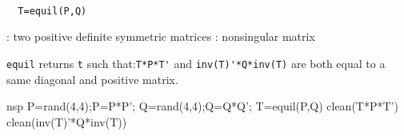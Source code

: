 \begin{mandesc}
   \\ %
\end{mandesc}
\begin{calling_sequence}
\begin{verbatim}
  T=equil(P,Q)  
\end{verbatim}
\end{calling_sequence}
\begin{parameters}
  \begin{varlist}
    : two positive definite symmetric matrices
    : nonsingular matrix
  \end{varlist}
\end{parameters}
\begin{mandescription}
  \verb!equil! returns \verb!t! such that:\verb!T*P*T'! and  \verb!inv(T)'*Q*inv(T)!  are both equal to a same 
  diagonal and positive matrix.
\end{mandescription}
\begin{examples}
  \begin{mintednsp}{nsp}
    P=rand(4,4);P=P*P';
    Q=rand(4,4);Q=Q*Q';
    T=equil(P,Q)
    clean(T*P*T')
    clean(inv(T)'*Q*inv(T))
  \end{mintednsp}
\end{examples}
\begin{manseealso}
      
\end{manseealso}
